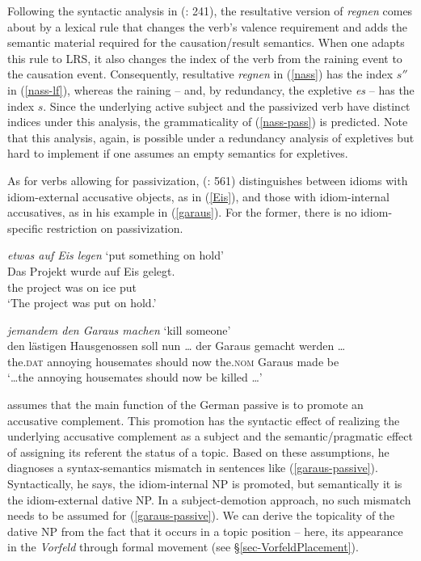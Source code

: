 \documentclass[output=paper]{langsci/langscibook}
\begin{document}
Following the syntactic analysis in \citeauthor{Mueller:02} (\citeyear{Mueller:02}: 241), the resultative version of \textit{regnen} comes about by a lexical rule that changes the verb's valence requirement and adds the semantic material required for the causation/result semantics. When one adapts this rule to LRS, it also changes the index of the verb from the raining event to the causation event. Consequently, resultative \textit{regnen} in (\ref{nass}) has the index $s''$ in (\ref{nass-lf}), whereas the raining -- and, by redundancy, the expletive \textit{es} -- has the index $s$. Since the underlying active subject and the passivized verb have distinct indices under this analysis, the grammaticality of (\ref{nass-pass}) is predicted. Note that this analysis, again, is possible under a redundancy analysis of expletives but hard to implement if one assumes an empty semantics for expletives.

As for verbs allowing for passivization, \citeauthor{Dobrovolskij:00} (\citeyear{Dobrovolskij:00}: 561) distinguishes between idioms with idiom-external accusative objects, as in (\ref{Eis}), and those with idiom-internal accusatives, as in his example in (\ref{garaus}). For the former, there is no idiom-specific restriction on passivization.

\begin{exe}
\ex \textit{etwas auf Eis legen} `put something on hold'\label{Eis}\\
\gll Das Projekt wurde auf Eis gelegt.\\
the project was on ice put\\
\glt `The project was put on hold.'
\end{exe}

\begin{exe}
\ex\label{garaus} \textit{jemandem den Garaus machen} `kill someone'\\
\gll {\ldots} den l\"astigen Hausgenossen soll nun {\textit{\ldots}}  der Garaus gemacht werden \ldots\\
{} the.\textsc{dat} annoying housemates should now {}  the.\textsc{nom} Garaus made be\\
\glt `\ldots\@ the annoying housemates should now be killed \ldots'
\label{garaus-passive}
\end{exe}

\cite{Dobrovolskij:00} assumes that the main function of the 
German passive is to promote an accusative complement. This promotion has the syntactic effect of realizing the underlying accusative complement as a subject and the semantic/pragmatic effect of assigning its referent the status of a topic. 
Based on these assumptions, he diagnoses a syntax-semantics mismatch in sentences like (\ref{garaus-passive}). 
Syntactically, he says, the idiom-internal NP is promoted, but semantically it is the idiom-external dative NP. 
In a  subject-demotion approach, no such mismatch needs to be assumed for (\ref{garaus-passive}). 
We can derive the topicality of the dative NP from the fact that it occurs in a topic position -- here, its appearance in the \emph{Vorfeld} through formal movement (see §\ref{sec-VorfeldPlacement}).
\end{document}
